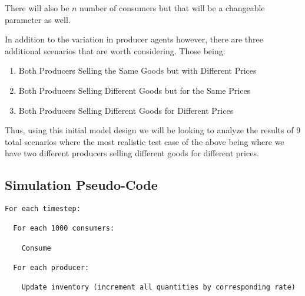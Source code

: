 \documentclass[11pt,letterpaper]{article}
\begin{document}
There will also be $n$ number of consumers but that will be a changeable parameter as well.

In addition to the variation in producer agents however, there are three additional scenarios that are worth considering. Those being:

\begin{enumerate}
\item
Both Producers Selling the Same Goods but with Different Prices
\item
Both Producers Selling Different Goods but for the Same Prices
\item
Both Producers Selling Different Goods for Different Prices
\end{enumerate}

Thus, using this initial model design we will be looking to analyze the results of 9 total scenarios where the most realistic test case of the above being where we have two different producers selling different goods for different prices.

\subsection*{Simulation Pseudo-Code}

\begin{verbatim}
For each timestep:

  For each 1000 consumers:

    Consume

  For each producer:

    Update inventory (increment all quantities by corresponding rate)

\end{verbatim}
\end{document}
